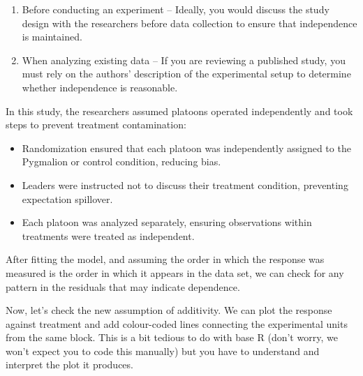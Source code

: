 \documentclass[
  letterpaper,
]{book}
\providecommand{\tightlist}{%
  \setlength{\itemsep}{0pt}\setlength{\parskip}{0pt}}\usepackage{longtable,booktabs,array}
\begin{document}
\begin{enumerate}
\def\labelenumi{\arabic{enumi}.}
\tightlist
\item
  Before conducting an experiment -- Ideally, you would discuss the
  study design with the researchers before data collection to ensure
  that independence is maintained.
\item
  When analyzing existing data -- If you are reviewing a published
  study, you must rely on the authors' description of the experimental
  setup to determine whether independence is reasonable.
\end{enumerate}

In this study, the researchers assumed platoons operated independently
and took steps to prevent treatment contamination:

\begin{itemize}
\tightlist
\item
  Randomization ensured that each platoon was independently assigned to
  the Pygmalion or control condition, reducing bias.
\item
  Leaders were instructed not to discuss their treatment condition,
  preventing expectation spillover.
\item
  Each platoon was analyzed separately, ensuring observations within
  treatments were treated as independent.
\end{itemize}

After fitting the model, and assuming the order in which the response
was measured is the order in which it appears in the data set, we can
check for any pattern in the residuals that may indicate dependence.

Now, let's check the new assumption of additivity. We can plot the
response against treatment and add colour-coded lines connecting the
experimental units from the same block. This is a bit tedious to do with
base R (don't worry, we won't expect you to code this manually) but you
have to understand and interpret the plot it produces.
\end{document}
